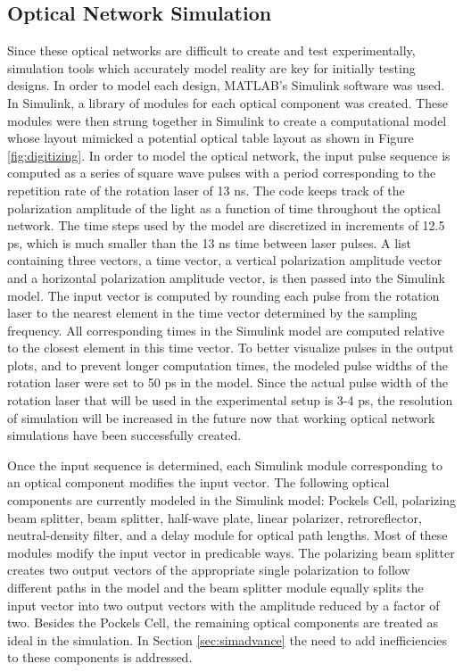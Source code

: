 \documentclass[pdftex,12pt,a4paper]{article}
\begin{document}
\subsection{Optical Network Simulation}
\label{simulation}

Since these optical networks are difficult to create and test experimentally, simulation tools which accurately model reality are key for initially testing designs. In order to model each design, MATLAB's Simulink software was used. In Simulink, a library of modules for each optical component was created. These modules were then strung together in Simulink to create a computational model whose layout mimicked a potential optical table layout as shown in Figure \ref{fig:digitizing}. In order to model the optical network, the input pulse sequence is computed as a series of square wave pulses with a period corresponding to the repetition rate of the rotation laser of 13 ns. The code keeps track of the polarization amplitude of the light as a function of time throughout the optical network. The time steps used by the model are discretized in increments of 12.5 ps, which is much smaller than the 13 ns time between laser pulses. A list containing three vectors, a time vector, a vertical polarization amplitude vector and a horizontal polarization amplitude vector, is then passed into the Simulink model. The input vector is computed by rounding each pulse from the rotation laser to the nearest element in the time vector determined by the sampling frequency. All corresponding times in the Simulink model are computed relative to the closest element in this time vector. To better visualize pulses in the output plots, and to prevent longer computation times, the modeled pulse widths of the rotation laser were set to 50 ps in the model. Since the actual pulse width of the rotation laser that will be used in the experimental setup is 3-4 ps, the resolution of simulation will be increased in the future now that working optical network simulations have been successfully created.

Once the input sequence is determined, each Simulink module corresponding to an optical component modifies the input vector. The following optical components are currently modeled in the Simulink model: Pockels Cell, polarizing beam splitter, beam splitter, half-wave plate, linear polarizer, retroreflector, neutral-density filter, and a delay module for optical path lengths. Most of these modules modify the input vector in predicable ways. The polarizing beam splitter creates two output vectors of the appropriate single polarization to follow different paths in the model and the beam splitter module equally splits the input vector into two output vectors with the amplitude reduced by a factor of two. Besides the Pockels Cell, the remaining optical components are treated as ideal in the simulation. In Section \ref{sec:simadvance} the need to add inefficiencies to these components is addressed.
\end{document}
